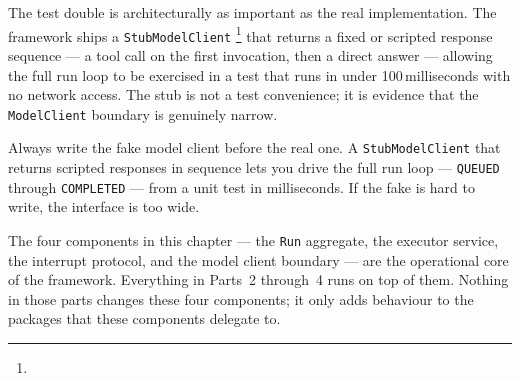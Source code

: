 The test double is architecturally as important as the real implementation.
The framework ships a \texttt{StubModelClient}%
\footnote{}
that returns a fixed or scripted response sequence — a tool call on the first
invocation, then a direct answer — allowing the full run loop to be exercised
in a test that runs in under 100\,milliseconds with no network access.
The stub is not a test convenience; it is evidence that the \texttt{ModelClient}
boundary is genuinely narrow.

\begin{tipbox}
  Always write the fake model client before the real one.
  A \texttt{StubModelClient} that returns scripted responses in sequence lets you
  drive the full run loop --- \texttt{QUEUED} through \texttt{COMPLETED} --- from
  a unit test in milliseconds.
  If the fake is hard to write, the interface is too wide.
\end{tipbox}

\begin{takeawaybox}
  The four components in this chapter --- the \texttt{Run} aggregate, the
  executor service, the interrupt protocol, and the model client boundary ---
  are the operational core of the framework.
  Everything in Parts~2 through~4 runs on top of them.
  Nothing in those parts changes these four components; it only adds behaviour
  to the packages that these components delegate to.
\end{takeawaybox}

